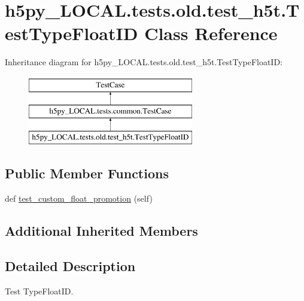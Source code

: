 \hypertarget{classh5py__LOCAL_1_1tests_1_1old_1_1test__h5t_1_1TestTypeFloatID}{}\section{h5py\+\_\+\+L\+O\+C\+A\+L.\+tests.\+old.\+test\+\_\+h5t.\+Test\+Type\+Float\+ID Class Reference}
\label{classh5py__LOCAL_1_1tests_1_1old_1_1test__h5t_1_1TestTypeFloatID}
Inheritance diagram for h5py\+\_\+\+L\+O\+C\+A\+L.\+tests.\+old.\+test\+\_\+h5t.\+Test\+Type\+Float\+ID\+:\begin{figure}[H]
\begin{center}
\leavevmode
\includegraphics[height=3.000000cm]{classh5py__LOCAL_1_1tests_1_1old_1_1test__h5t_1_1TestTypeFloatID}
\end{center}
\end{figure}
\subsection*{Public Member Functions}
\begin{DoxyCompactItemize}
\item 
def \hyperlink{classh5py__LOCAL_1_1tests_1_1old_1_1test__h5t_1_1TestTypeFloatID_a0818382aeb86a84fccbb1e62fb4d4352}{test\+\_\+custom\+\_\+float\+\_\+promotion} (self)
\end{DoxyCompactItemize}
\subsection*{Additional Inherited Members}


\subsection{Detailed Description}
\begin{DoxyVerb}Test TypeFloatID.\end{DoxyVerb}
 

